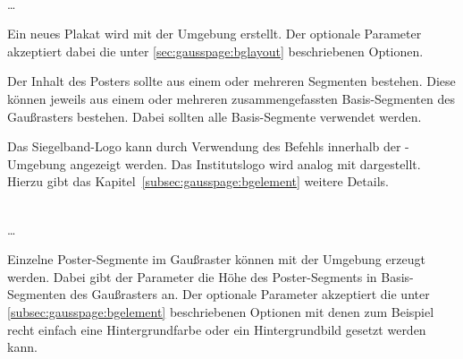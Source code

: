 \begin{Declaration}
    \\
  \quad\dots\\
\end{Declaration}

Ein neues Plakat wird mit der Umgebung  erstellt.
Der optionale Parameter  akzeptiert dabei die
unter \ref{sec:gausspage:bglayout} beschriebenen Optionen.

Der Inhalt des Posters sollte aus einem oder mehreren Segmenten bestehen.
Diese können jeweils aus einem oder mehreren zusammengefassten Basis-Segmenten
des Gaußrasters bestehen. Dabei sollten alle Basis-Segmente verwendet werden.

\begin{sloppypar}
Das Siegelband-Logo kann durch Verwendung des Befehls 
innerhalb der -Umgebung angezeigt werden.
Das Institutslogo wird analog mit 
dargestellt. Hierzu gibt das Kapitel~\ref{subsec:gausspage:bgelement}
weitere Details.
\end{sloppypar}

\begin{Declaration}
    \\
  \quad\dots\\
\end{Declaration}

Einzelne Poster-Segmente im Gaußraster können mit der Umgebung
 erzeugt werden.
Dabei gibt der Parameter  die Höhe des
Poster-Segments in Basis-Segmenten des Gaußrasters an.
Der optionale Parameter  akzeptiert die
unter \ref{subsec:gausspage:bgelement} beschriebenen Optionen mit
denen zum Beispiel recht einfach eine Hintergrundfarbe oder ein Hintergrundbild
gesetzt werden kann.

